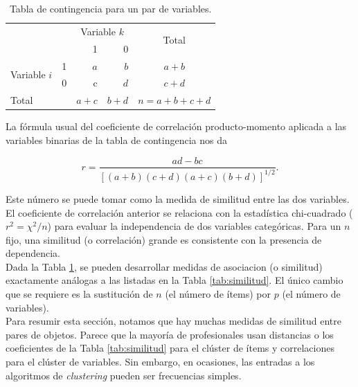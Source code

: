\documentclass[a4paper, 20pt]{article}
\begin{document}
\begin{table}[h]
  \centering
  \caption{Tabla de contingencia para un par de variables.}
  \label{tab:contingencia_var}
\resizebox{7.5cm}{!} {
\begin{tabular}{llrrrr}
\toprule
\multicolumn{2}{l}{\multirow{2}{*}{}} & \multicolumn{2}{c}{Variable $k$} & \multicolumn{2}{c}{\multirow{2}{*}{Total}} \\\cmidrule{3-4}
\multicolumn{2}{l}{}                  & 1             & 0       & \multicolumn{2}{c}{}                        \\ \hline
\multirow{2}{*}{Variable $i$}       & 1      & $a$          & $b$       & \multicolumn{2}{c}{$a+b$}                     \\
                              & 0      & c            & $d$       & \multicolumn{2}{c}{$c+d$}                     \\ \hline
\multicolumn{2}{l}{Total}            & $a+c$          & $b+d$     & \multicolumn{2}{c}{$n=a+b+c+d$}\\
\bottomrule            
\end{tabular}
}
\end{table}

La fórmula usual del coeficiente de correlación producto-momento aplicada a las variables binarias de la tabla de contingencia nos da

$$r = \frac{ad-bc}{[(a+b)(c+d)(a+c)(b+d)]^{1/2}}.$$

Este número se puede tomar como la medida de similitud entre las dos variables.\\

El coeficiente de correlación anterior se relaciona con la estadística chi-cuadrado ($r^2=\chi^2/n$) para evaluar la independencia de dos variables categóricas. Para un $n$ fijo, una similitud (o correlación) grande es consistente con la presencia de dependencia.\\

Dada la Tabla \ref{tab:contingencia_var}, se pueden desarrollar medidas de asociacion (o similitud) exactamente análogas a las listadas en la Tabla \ref{tab:similitud}. El único cambio que se requiere es la sustitución de $n$ (el número de ítems) por $p$ (el número de variables).\\

Para resumir esta sección, notamos que hay muchas medidas de similitud entre pares de objetos. Parece que la mayoría de profesionales usan distancias o los coeficientes de la Tabla \ref{tab:similitud} para el clúster de ítems y correlaciones para el clúster de variables. Sin embargo, en ocasiones, las entradas a los algoritmos de \textit{clustering} pueden ser frecuencias simples.\\
\end{document}
